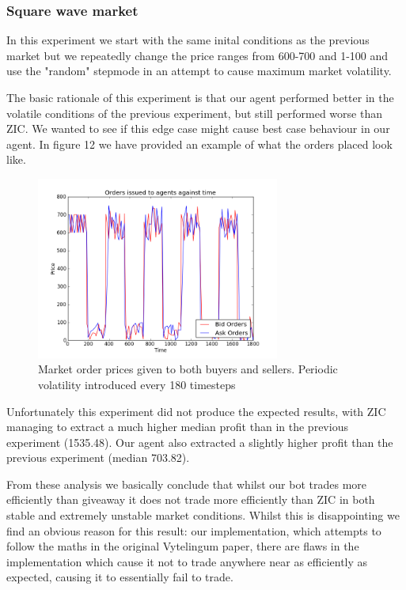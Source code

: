\documentclass{acm_proc_article-sp}
\begin{document}
\subsubsection{Square wave market}

In this experiment we start with the same inital conditions as the previous
market but we repeatedly change the price ranges from 600-700 and 1-100 and use
the "random" stepmode in an attempt to cause maximum market volatility.

The basic rationale of this experiment is that our agent performed better in
the volatile conditions of the previous experiment, but still performed worse
than ZIC. We wanted to see if this edge case might cause best case behaviour in
our agent. In figure 12 we have provided an example of what the orders placed
look like.

\begin{figure}[h!] \includegraphics[width=80mm]{squarewave.png} \caption{Market
order prices given to both buyers and sellers. Periodic volatility introduced
every 180 timesteps} \end{figure}

Unfortunately this experiment did not produce the expected results, with ZIC
managing to extract a much higher median profit than in the previous experiment
(1535.48). Our agent also extracted a slightly higher profit than the previous
experiment (median 703.82).

From these analysis we basically conclude that whilst our bot trades more
efficiently than giveaway it does not trade more efficiently than ZIC in both
stable and extremely unstable market conditions. Whilst this is disappointing
we find an obvious reason for this result: our implementation, which attempts
to follow the maths in the original Vytelingum\cite{Vytellingum:AA} paper,
there are flaws in the implementation which cause it not to trade anywhere near
as efficiently as expected, causing it to essentially fail to trade.
\end{document}
